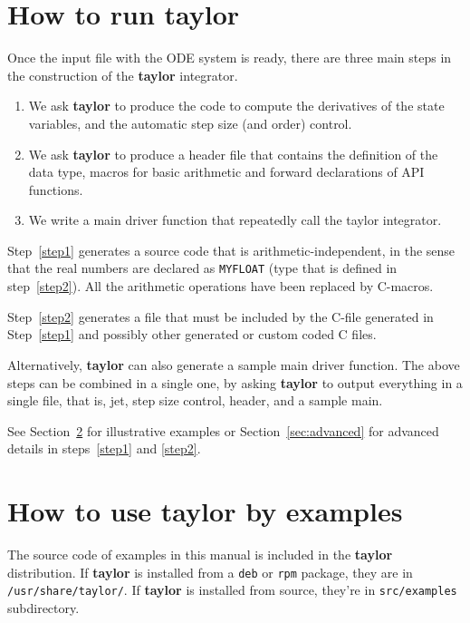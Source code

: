 \documentclass[10pt]{article}
\theoremstyle{remark}
\newcommand{\taylorname}{{\bf taylor}}
\newcommand{\myfloat}{{\tt MY\symbol{95}FLOAT}}
\begin{document}
\section{How to run \taylorname{}}

Once the input file with the ODE system is ready, there are three main
steps in the construction of the \taylorname{} integrator.

\begin{enumerate}
\renewcommand{\theenumi}{\arabic{enumi}}
\renewcommand{\labelenumi}{\theenumi.)}
    \item\label{step1} We ask \taylorname{} to produce the code to
      compute the derivatives of the state variables, and the
      automatic step size (and order) control.
    \item\label{step2} We ask \taylorname{} to produce a header file
      that contains the definition of the data type, macros for basic
      arithmetic and forward declarations of API functions.
    \item\label{step3} We write a main driver function that repeatedly
      call the taylor integrator.
\end{enumerate}
Step~\ref{step1} generates a source code that is
arithmetic-independent, in the sense that the real numbers are
declared as \myfloat{} (type that is defined in step~\ref{step2}). All
the arithmetic operations have been replaced by C-macros. 

\smallskip

Step~\ref{step2} generates a file that must be included by the C-file
generated in Step~\ref{step1} and possibly other generated or custom
coded C files.

\medskip

Alternatively, \taylorname{} can also generate a sample main driver
function.  The above steps can be combined in a single one, by asking
\taylorname{} to output everything in a single file, that is, jet,
step size control, header, and a sample main.

\medskip

See Section~\ref{sec:examples} for illustrative examples or
Section~\ref{sec:advanced} for advanced details in steps~\ref{step1}
and \ref{step2}.

\section{How to use \taylorname{} by examples}\label{sec:examples}

The source code of examples in this manual is included in the
\taylorname{} distribution.  If \taylorname{} is installed from a
\verb+deb+ or \verb+rpm+ package, they are in
\verb+/usr/share/taylor/+. If \taylorname{} is installed from source,
they're in \verb+src/examples+ subdirectory.
\end{document}
